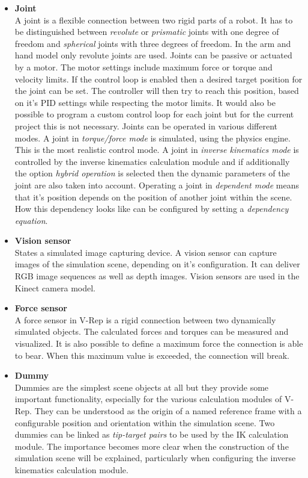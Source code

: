 \begin{itemize}
\item \textbf{Joint} \\
A joint is a flexible connection between two rigid parts of a robot. It has to be distinguished between \emph{revolute} or \emph{prismatic} joints with one degree of freedom and \emph{spherical} joints with three degrees of freedom. In the arm and hand model only revolute joints are used. Joints can be passive or actuated by a motor. The motor settings include maximum force or torque and velocity limits. If the control loop is enabled then a desired target position for the joint can be set. The controller will then try to reach this position, based on it's PID settings while respecting the motor limits. It would also be possible to program a custom control loop for each joint but for the current project this is not necessary. Joints can be operated in various different modes. A joint in \emph{torque/force mode} is simulated, using the physics engine. This is the most realistic control mode. A joint in \emph{inverse kinematics mode} is controlled by the inverse kinematics calculation module and if additionally the option \emph{hybrid operation} is selected then the dynamic parameters of the joint are also taken into account. Operating a joint in \emph{dependent mode} means that it's position depends on the position of another joint within the scene. How this dependency looks like can be configured by setting a \emph{dependency equation}.

\item \textbf{Vision sensor} \\
States a simulated image capturing device. A vision sensor can capture images of the simulation scene, depending on it's configuration. It can deliver RGB image sequences as well as depth images. Vision sensors are used in the Kinect camera model.

\item \textbf{Force sensor} \\
A force sensor in V-Rep is a rigid connection between two dynamically simulated objects. The calculated forces and torques can be measured and visualized. It is also possible to define a maximum force the connection is able to bear. When this maximum value is exceeded, the connection will break.

\item \textbf{Dummy} \\
Dummies are the simplest scene objects at all but they provide some important functionality, especially for the various calculation modules of V-Rep. They can be understood as the origin of a named reference frame with a configurable position and orientation within the simulation scene. Two dummies can be linked as \emph{tip-target pairs} to be used by the IK calculation module. The importance becomes more clear when the construction of the simulation scene will be explained, particularly when configuring the inverse kinematics calculation module. 

\end{itemize}

